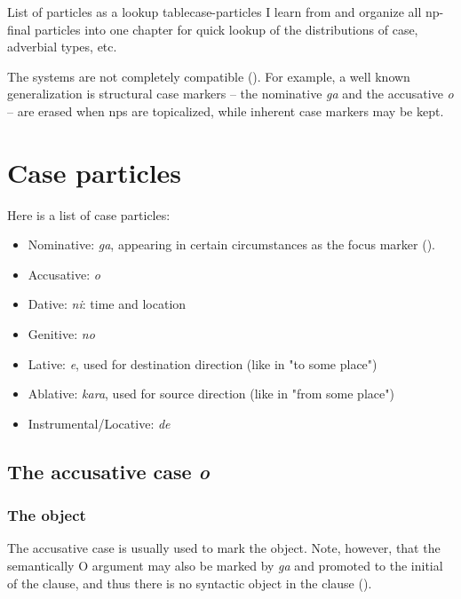 \documentclass[UTF8, a4paper, oneside, scheme=plain]{ctexrep}
\newcommand{\corpus}[1]{\emph{#1}}
\begin{document}
\begin{theorybox}{List of particles as a lookup table}{case-particles}
    I learn from \citet{jacques2021grammar} and organize all \ac{np}-final particles into one chapter 
    for quick lookup of the distributions of case, adverbial types, etc.
\end{theorybox}

The systems are not completely compatible ().
For example, a well known generalization is structural case markers 
-- the nominative \corpus{ga} and the accusative \corpus{o} -- 
are erased when \ac{np}s are topicalized,
while inherent case markers may be kept.

\section{Case particles}\label{sec:case-particle}

Here is a list of case particles:
\begin{itemize}
    \item Nominative: \corpus{ga}, 
    appearing in certain circumstances as the focus marker ().
    \item Accusative: \corpus{o}
    \item Dative: \corpus{ni}: time and location 
    \item Genitive: \corpus{no} 
    \item Lative: \corpus{e}, used for destination direction (like in "to some place")
    \item Ablative: \corpus{kara}, used for source direction (like in "from some place")
    \item Instrumental/Locative: \corpus{de}
\end{itemize}

\subsection{The accusative case \corpus{o}}

\subsubsection{The object}

The accusative case is usually used to mark the object.
Note, however, that the semantically O argument may also be marked by \corpus{ga} 
and promoted to the initial of the clause, 
and thus there is no syntactic object in the clause 
().
\end{document}
